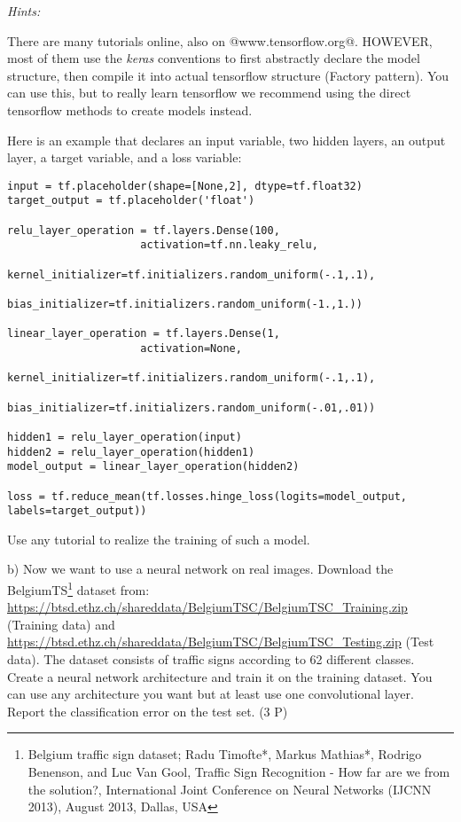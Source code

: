 \textit{Hints:}
\begin{items}
\item There are many tutorials online, also on @www.tensorflow.org@. HOWEVER, most of them use the \emph{keras} conventions to first abstractly declare the model structure, then compile it into actual tensorflow structure (Factory pattern). You can use this, but to really learn tensorflow we recommend using the direct tensorflow methods to create models instead.
\item Here is an example that declares an input variable, two hidden layers, an output layer, a target variable, and a loss variable:
\begin{code}%
\begin{verbatim}
input = tf.placeholder(shape=[None,2], dtype=tf.float32)
target_output = tf.placeholder('float')

relu_layer_operation = tf.layers.Dense(100, 
                     activation=tf.nn.leaky_relu, 
                     kernel_initializer=tf.initializers.random_uniform(-.1,.1), 
                     bias_initializer=tf.initializers.random_uniform(-1.,1.))

linear_layer_operation = tf.layers.Dense(1, 
                     activation=None, 
                     kernel_initializer=tf.initializers.random_uniform(-.1,.1), 
                     bias_initializer=tf.initializers.random_uniform(-.01,.01))

hidden1 = relu_layer_operation(input)
hidden2 = relu_layer_operation(hidden1)
model_output = linear_layer_operation(hidden2)

loss = tf.reduce_mean(tf.losses.hinge_loss(logits=model_output, labels=target_output))
\end{verbatim}
\end{code}
\item Use any tutorial to realize the training of such a model.
\end{items}


b) Now we want to use a neural network on real images. Download the BelgiumTS\footnote{Belgium traffic sign dataset; Radu Timofte*, Markus Mathias*, Rodrigo Benenson, and Luc Van Gool, Traffic Sign Recognition - How far are we from the solution?, International Joint Conference on Neural Networks (IJCNN 2013), August 2013, Dallas, USA} dataset from: \url{https://btsd.ethz.ch/shareddata/BelgiumTSC/BelgiumTSC_Training.zip} (Training data) and \url{https://btsd.ethz.ch/shareddata/BelgiumTSC/BelgiumTSC_Testing.zip} (Test data). The dataset consists of traffic signs according to 62 different classes. Create a neural network architecture and train it on the training dataset. You can use any architecture you want but at least use one convolutional layer. Report the classification error on the test set. (3 P)

